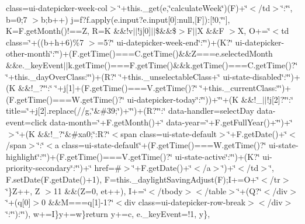\begin{DoxyCompactItemize}
class=\textquotesingle{}ui-\/datepicker-\/week-\/col\textquotesingle{}$>$\char`\"{}+this.\+\_\+get(e,\char`\"{}calculate\+Week\char`\"{})(\+F)+\char`\"{}$<$/td$>$\char`\"{}\+:\char`\"{}\char`\"{}, b=0;7 $>$b;b++) j=f?f.\+apply(e.\+input?e.\+input\mbox{[}0\mbox{]}\+:null,\mbox{[}\+F\mbox{]})\+:\mbox{[}!0,\char`\"{}\char`\"{}\mbox{]}, K=\+F.\+get\+Month()!==\+Z, R=\+K \&\&!v$\vert$$\vert$!j\mbox{[}0\mbox{]}$\vert$$\vert$\$\&\&\$$>$\+F$\vert$$\vert$\+X \&\&\+F $>$\+X, O+=\char`\"{}$<$td class=\textquotesingle{}\char`\"{}+((b+h+6)\%7 $>$=5?\char`\"{} ui-\/datepicker-\/week-\/end\char`\"{}\+:\char`\"{}\char`\"{})+(\+K?\char`\"{} ui-\/datepicker-\/other-\/month\char`\"{}\+:\char`\"{}\char`\"{})+(\+F.\+get\+Time()===\+C.\+get\+Time()\&\&\+Z===e.\+selected\+Month \&\&e.\+\_\+key\+Event$\vert$$\vert$k.\+get\+Time()===\+F.\+get\+Time()\&\&k.\+get\+Time()===\+C.\+get\+Time()?\char`\"{} \char`\"{}+this.\+\_\+day\+Over\+Class\+:\char`\"{}\char`\"{})+(\+R?\char`\"{} \char`\"{}+this.\+\_\+unselectable\+Class+\char`\"{} ui-\/state-\/disabled\char`\"{}\+:\char`\"{}\char`\"{})+(\+K \&\&!\+\_\+?\char`\"{}\char`\"{}\+:\char`\"{} \char`\"{}+j\mbox{[}1\mbox{]}+(\+F.\+get\+Time()===\+V.\+get\+Time()?\char`\"{} \char`\"{}+this.\+\_\+current\+Class\+:\char`\"{}\char`\"{})+(\+F.\+get\+Time()===\+W.\+get\+Time()?\char`\"{} ui-\/datepicker-\/today\char`\"{}\+:\char`\"{}\char`\"{}))+\char`\"{}\textquotesingle{}\char`\"{}+(\+K \&\&!\+\_\+$\vert$$\vert$!j\mbox{[}2\mbox{]}?\char`\"{}\char`\"{}\+:\char`\"{} title=\textquotesingle{}\char`\"{}+j\mbox{[}2\mbox{]}.\+replace(/\textquotesingle{}/g,\char`\"{}\&\#39;\char`\"{})+\char`\"{}\textquotesingle{}\char`\"{})+(\+R?\char`\"{}\char`\"{}\+:\char`\"{} data-\/handler=\textquotesingle{}select\+Day\textquotesingle{} data-\/event=\textquotesingle{}click\textquotesingle{} data-\/month=\textquotesingle{}\char`\"{}+\+F.\+get\+Month()+\char`\"{}\textquotesingle{} data-\/year=\textquotesingle{}\char`\"{}+\+F.\+get\+Full\+Year()+\char`\"{}\textquotesingle{}\char`\"{})+\char`\"{}$>$\char`\"{}+(\+K \&\&!\+\_\+?\char`\"{}\&\#xa0;\char`\"{}\+:\+R?\char`\"{}$<$span class=\textquotesingle{}ui-\/state-\/default\textquotesingle{}$>$\char`\"{}+\+F.\+get\+Date()+\char`\"{}$<$/span$>$\char`\"{}\+:\char`\"{}$<$a class=\textquotesingle{}ui-\/state-\/default\char`\"{}+(\+F.\+get\+Time()===\+W.\+get\+Time()?\char`\"{} ui-\/state-\/highlight\char`\"{}\+:\char`\"{}\char`\"{})+(\+F.\+get\+Time()===\+V.\+get\+Time()?\char`\"{} ui-\/state-\/active\char`\"{}\+:\char`\"{}\char`\"{})+(\+K?\char`\"{} ui-\/priority-\/secondary\char`\"{}\+:\char`\"{}\char`\"{})+\char`\"{}\textquotesingle{} href=\textquotesingle{}\#\textquotesingle{}$>$\char`\"{}+\+F.\+get\+Date()+\char`\"{}$<$/a$>$\char`\"{})+\char`\"{}$<$/td$>$\char`\"{}, F.\+set\+Date(\+F.\+get\+Date()+1), F=this.\+\_\+daylight\+Saving\+Adjust(\+F);\+I+=\+O+\char`\"{}$<$/tr$>$\char`\"{}\}\+Z++, Z $>$11 \&\&(\+Z=0, et++), I+=\char`\"{}$<$/tbody$>$$<$/table$>$\char`\"{}+(\+Q?\char`\"{}$<$/div$>$\char`\"{}+(q\mbox{[}0\mbox{]}$>$0 \&\&\+M===q\mbox{[}1\mbox{]}-\/1?\char`\"{}$<$div class=\textquotesingle{}ui-\/datepicker-\/row-\/break\textquotesingle{}$>$$<$/div$>$\char`\"{}\+:\char`\"{}\char`\"{})\+:\char`\"{}\char`\"{}), w+=\+I\}y+=w\}return y+=c, e.\+\_\+key\+Event=!1, y\}, 
\end{DoxyCompactItemize}
